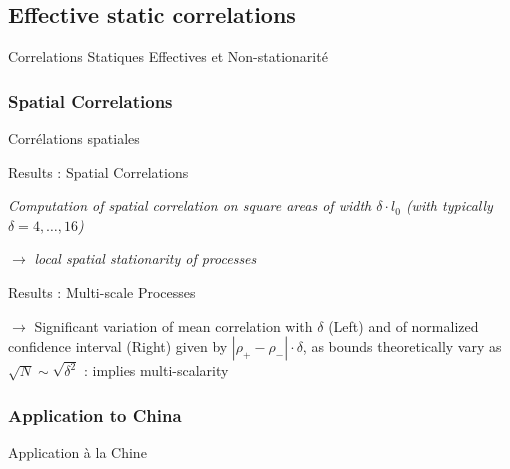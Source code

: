 \subsection{Effective static correlations}{Correlations Statiques Effectives et Non-stationarité}



\subsubsection{Spatial Correlations}{Corrélations spatiales}




Results : Spatial Correlations

\textit{Computation of spatial correlation on square areas of width $\delta\cdot l_0$ (with typically $\delta = 4, \ldots , 16$)}



$\rightarrow$ \textit{local spatial stationarity of processes}



% 



Results : Multi-scale Processes

\medskip

$\rightarrow$ Significant variation of mean correlation with $\delta$ (Left) and of normalized confidence interval (Right) given by $\left|\rho_+ - \rho_-\right|\cdot \delta$, as bounds theoretically vary as $\sqrt{N} \sim \sqrt{\delta^2}$ : implies multi-scalarity








\subsubsection{Application to China}{Application à la Chine}







